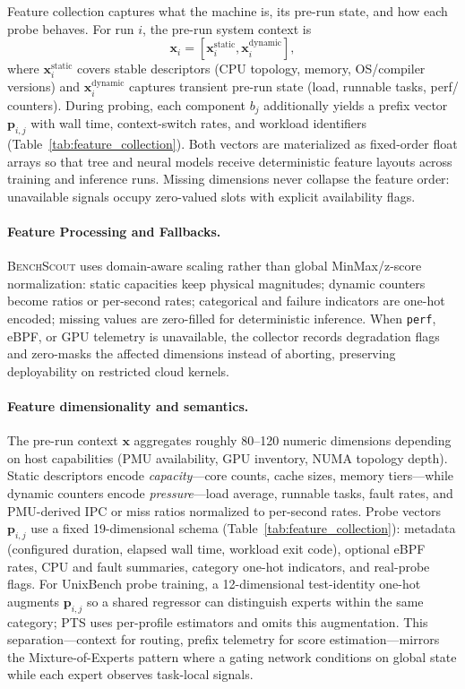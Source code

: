 \documentclass[sigplan,10pt]{acmart}
\newcommand{\ourmethod}{\textsc{BenchScout}\xspace}
\begin{document}
Feature collection captures what the machine is, its pre-run state, and how each probe behaves.
For run $i$, the pre-run system context is
\begin{equation}
\label{eq:system-context}
\mathbf{x}_i = [\mathbf{x}_i^{\mathrm{static}}, \mathbf{x}_i^{\mathrm{dynamic}}],
\end{equation}
where $\mathbf{x}_i^{\mathrm{static}}$ covers stable descriptors (CPU topology, memory, OS/compiler versions) and $\mathbf{x}_i^{\mathrm{dynamic}}$ captures transient pre-run state (load, runnable tasks, perf/ counters).
During probing, each component $b_j$ additionally yields a prefix vector $\mathbf{p}_{i,j}$ with wall time, context-switch rates, and workload identifiers (Table~\ref{tab:feature_collection}).
Both vectors are materialized as fixed-order float arrays so that tree and neural models receive deterministic feature layouts across training and inference runs.
Missing dimensions never collapse the feature order: unavailable signals occupy zero-valued slots with explicit availability flags.

\paragraph{Feature Processing and Fallbacks.}
\ourmethod uses domain-aware scaling rather than global MinMax/z-score normalization: static capacities keep physical magnitudes; dynamic counters become ratios or per-second rates; categorical and failure indicators are one-hot encoded; missing values are zero-filled for deterministic inference.
When \texttt{perf}, eBPF, or GPU telemetry is unavailable, the collector records degradation flags and zero-masks the affected dimensions instead of aborting, preserving deployability on restricted cloud kernels.

\paragraph{Feature dimensionality and semantics.}
The pre-run context $\mathbf{x}$ aggregates roughly 80--120 numeric dimensions depending on host capabilities (PMU availability, GPU inventory, NUMA topology depth).
Static descriptors encode \emph{capacity}---core counts, cache sizes, memory tiers---while dynamic counters encode \emph{pressure}---load average, runnable tasks, fault rates, and PMU-derived IPC or miss ratios normalized to per-second rates.
Probe vectors $\mathbf{p}_{i,j}$ use a fixed 19-dimensional schema (Table~\ref{tab:feature_collection}): metadata (configured duration, elapsed wall time, workload exit code), optional eBPF rates,  CPU and fault summaries, category one-hot indicators, and real-probe flags.
For UnixBench probe training, a 12-dimensional test-identity one-hot augments $\mathbf{p}_{i,j}$ so a shared regressor can distinguish experts within the same category; PTS uses per-profile estimators and omits this augmentation.
This separation---context for routing, prefix telemetry for score estimation---mirrors the Mixture-of-Experts pattern where a gating network conditions on global state while each expert observes task-local signals.
\end{document}
